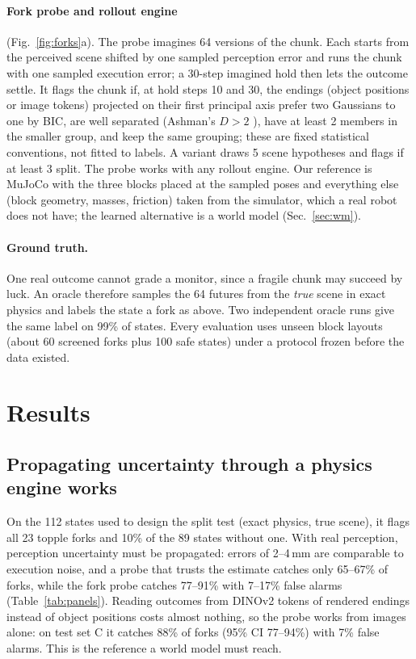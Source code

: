 \documentclass{article}
\begin{document}
\paragraph{Fork probe and rollout engine} (Fig.~\ref{fig:forks}a). The probe imagines 64 versions of the
chunk. Each starts from the perceived scene shifted by one sampled perception error and runs the chunk
with one sampled execution error; a 30-step imagined hold then lets the outcome settle. It flags
the chunk if, at hold steps 10 and 30, the endings (object positions or image tokens) projected on their
first principal axis prefer two Gaussians to one by BIC, are well separated (Ashman's $D>2$
\citep{ashman1994detecting}), have at least 2 members in the smaller group, and keep the same grouping;
these are fixed statistical conventions, not fitted to labels. A variant draws 5 scene hypotheses and
flags if at least 3 split. The probe works with any rollout engine. Our reference is MuJoCo with the
three blocks placed at the sampled poses and everything else (block geometry, masses, friction) taken from
the simulator, which a real robot does not have; the learned alternative is a world model (Sec.~\ref{sec:wm}).

\paragraph{Ground truth.} One real outcome cannot grade a monitor, since a fragile chunk may succeed by
luck. An oracle therefore samples the 64 futures from the \emph{true} scene in exact physics and labels
the state a fork as above. Two independent oracle runs give the same label on 99\% of states. Every evaluation uses unseen block layouts (about 60 screened forks plus 100
safe states) under a protocol frozen before the data existed.

\section{Results}
\subsection{Propagating uncertainty through a physics engine works}\label{sec:validation}
On the 112 states used to design the split test (exact physics, true scene), it flags all 23 topple
forks and 10\% of the 89 states without one. With real perception, perception uncertainty must be
propagated: errors of 2--4\,mm are comparable to execution noise, and a probe that trusts the estimate
catches only 65--67\% of forks, while the fork probe catches 77--91\% with 7--17\% false alarms
(Table~\ref{tab:panels}). Reading outcomes from DINOv2 tokens of rendered endings instead of object
positions costs almost nothing, so the probe works from images alone: on test set C it catches 88\%
of forks (95\% CI 77--94\%) with 7\% false alarms. This is the reference a world model must reach.
\end{document}
